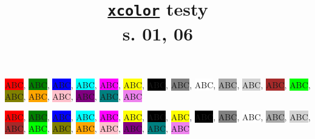 \documentclass[a4paper,11pt]{article}
\title{\href{https://repo.skni.umcs.pl/ctan/macros/latex/contrib/xcolor/xcolor.pdf}{\texttt{xcolor}} testy \\
  s. 01, 06}
\author{}
\begin{document}





\maketitle %





\noindent
\color{black}
\colorbox{red}{ABC},
\colorbox{green}{ABC},
\colorbox{blue}{ABC},
\colorbox{cyan}{ABC},
\colorbox{magenta}{ABC},
\colorbox{yellow}{ABC},
\color{white} \colorbox{black}{ABC}, \color{black}
\colorbox{gray}{ABC},
\colorbox{white}{ABC},
\colorbox{darkgray}{ABC},
\colorbox{lightgray}{ABC},
\colorbox{brown}{ABC},
\colorbox{lime}{ABC},
\colorbox{olive}{ABC},
\colorbox{orange}{ABC},
\colorbox{pink}{ABC},
\colorbox{purple}{ABC},
\colorbox{teal}{ABC},
\colorbox{violet}{ABC}

\vspace{1em}





\begingroup

\color{black}


\noindent
\colorbox{red}{ABC},
\colorbox{green}{ABC},
\colorbox{blue}{ABC},
\colorbox{cyan}{ABC},
\colorbox{magenta}{ABC},
\colorbox{yellow}{ABC},
\colorbox{black}{ABC},
\colorbox{yellow}{ABC},
\colorbox{black}{ABC},
\colorbox{gray}{ABC},
\colorbox{white}{ABC},
\colorbox{darkgray}{ABC},
\colorbox{lightgray}{ABC},
\colorbox{brown}{ABC},
\colorbox{lime}{ABC},
\colorbox{olive}{ABC},
\colorbox{orange}{ABC},
\colorbox{pink}{ABC},
\colorbox{purple}{ABC},
\colorbox{teal}{ABC},
\colorbox{violet}{ABC}

\endgroup

































\end{document}
